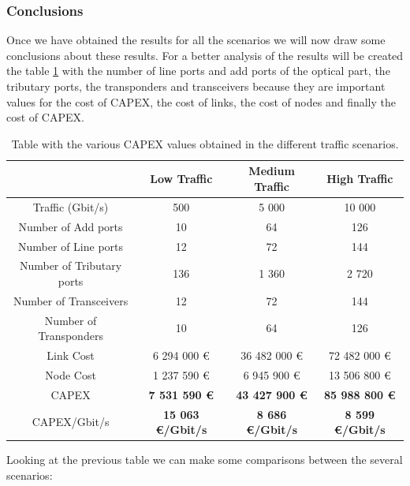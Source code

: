 \subsubsection{Conclusions}

Once we have obtained the results for all the scenarios we will now draw some conclusions about these results. For a better analysis of the results will be created the table \ref{table_comparative_transluc_surv} with the number of line ports and add ports of the optical part, the tributary ports, the transponders and transceivers because they are important values for the cost of CAPEX, the cost of links, the cost of nodes and finally the cost of CAPEX.

\begin{table}[h!]
\centering
\begin{tabular}{| c | c | c | c |}
 \hline
  & Low Traffic & Medium Traffic  & High Traffic \\
 \hline\hline
 Traffic (Gbit/s) & 500 & 5 000 & 10 000 \\ \hline
 Number of Add ports & 10 & 64 & 126 \\ \hline
 Number of Line ports & 12 & 72 & 144 \\ \hline
 Number of Tributary ports & 136 & 1 360 & 2 720 \\ \hline
 Number of Transceivers & 12 & 72 & 144 \\ \hline
 Number of Transponders & 10 & 64 & 126 \\ \hline
 Link Cost & 6 294 000 \euro & 36 482 000 \euro & 72 482 000 \euro \\ \hline
 Node Cost & 1 237 590 \euro & 6 945 900 \euro & 13 506 800 \euro \\ \hline
 CAPEX & \textbf{7 531 590 \euro} & \textbf{43 427 900 \euro} & \textbf{85 988 800 \euro} \\ \hline
 CAPEX/Gbit/s & \textbf{15 063 \euro/Gbit/s} & \textbf{8 686 \euro/Gbit/s} & \textbf{8 599 \euro/Gbit/s}\\
 \hline
\end{tabular}
\caption{Table with the various CAPEX values obtained in the different traffic scenarios.}
\label{table_comparative_transluc_surv}
\end{table}
\newpage
Looking at the previous table we can make some comparisons between the several scenarios:

